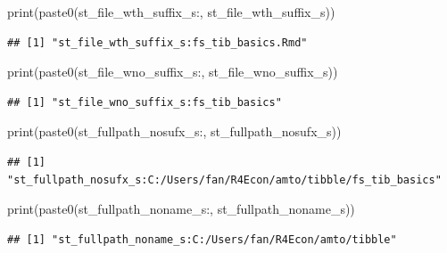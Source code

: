 \documentclass[
]{book}
\newenvironment{Shaded}{\begin{snugshade}}{\end{snugshade}}
\newcommand{\FunctionTok}[1]{\textcolor[rgb]{0.00,0.00,0.00}{#1}}
\newcommand{\NormalTok}[1]{#1}
\newcommand{\StringTok}[1]{\textcolor[rgb]{0.31,0.60,0.02}{#1}}
\begin{document}
\begin{Shaded}
\begin{Highlighting}[]
\FunctionTok{print}\NormalTok{(}\FunctionTok{paste0}\NormalTok{(}\StringTok{\textquotesingle{}st\_file\_wth\_suffix\_s:\textquotesingle{}}\NormalTok{, st\_file\_wth\_suffix\_s))}
\end{Highlighting}
\end{Shaded}

\begin{verbatim}
## [1] "st_file_wth_suffix_s:fs_tib_basics.Rmd"
\end{verbatim}

\begin{Shaded}
\begin{Highlighting}[]
\FunctionTok{print}\NormalTok{(}\FunctionTok{paste0}\NormalTok{(}\StringTok{\textquotesingle{}st\_file\_wno\_suffix\_s:\textquotesingle{}}\NormalTok{, st\_file\_wno\_suffix\_s))}
\end{Highlighting}
\end{Shaded}

\begin{verbatim}
## [1] "st_file_wno_suffix_s:fs_tib_basics"
\end{verbatim}

\begin{Shaded}
\begin{Highlighting}[]
\FunctionTok{print}\NormalTok{(}\FunctionTok{paste0}\NormalTok{(}\StringTok{\textquotesingle{}st\_fullpath\_nosufx\_s:\textquotesingle{}}\NormalTok{, st\_fullpath\_nosufx\_s))}
\end{Highlighting}
\end{Shaded}

\begin{verbatim}
## [1] "st_fullpath_nosufx_s:C:/Users/fan/R4Econ/amto/tibble/fs_tib_basics"
\end{verbatim}

\begin{Shaded}
\begin{Highlighting}[]
\FunctionTok{print}\NormalTok{(}\FunctionTok{paste0}\NormalTok{(}\StringTok{\textquotesingle{}st\_fullpath\_noname\_s:\textquotesingle{}}\NormalTok{, st\_fullpath\_noname\_s))}
\end{Highlighting}
\end{Shaded}

\begin{verbatim}
## [1] "st_fullpath_noname_s:C:/Users/fan/R4Econ/amto/tibble"
\end{verbatim}
\end{document}

